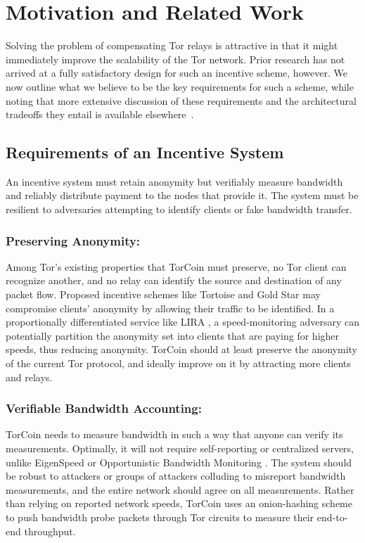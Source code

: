 \section{Motivation and Related Work} \label{motivation}

Solving the problem of
compensating Tor relays is attractive in that it might immediately improve the
scalability of the Tor network. Prior research has not arrived
at a fully satisfactory design for such an incentive scheme, however.
We now outline what we believe to be the key requirements for such a scheme,
while noting that more extensive discussion of these requirements
and the architectural tradeoffs they entail is available
elsewhere~\cite{jansen14onions}.

\subsection{Requirements of an Incentive System}
An incentive system must retain anonymity but verifiably measure
bandwidth and reliably distribute payment to the nodes that provide it. The
system must be resilient to adversaries attempting to identify clients or fake
bandwidth transfer.

\subsubsection{Preserving Anonymity:} 
Among Tor's existing properties that TorCoin must preserve,
no Tor client can recognize another, and no relay can
identify the source and destination of any packet flow. Proposed
incentive schemes like Tortoise\cite{acsac11-tortoise} and Gold Star\cite
{incentives-fc10} may compromise clients' anonymity by allowing their traffic
to be identified\cite{jansen2013lira}. In a proportionally differentiated
service \cite{blake1998architecture, dovrolis1999case} like LIRA
\cite{jansen2013lira},
a speed-monitoring adversary can potentially partition the
anonymity set into clients that are paying for higher speeds, thus reducing
anonymity. TorCoin should at least preserve the
anonymity of the current Tor protocol,
and ideally improve on it by attracting more clients and relays.

\subsubsection{Verifiable Bandwidth Accounting:} TorCoin needs to measure
bandwidth in such a way that anyone can verify its measurements. Optimally, it
will not require self-reporting or centralized servers, unlike EigenSpeed
\cite{snader2009eigenspeed} or Opportunistic Bandwidth Monitoring
\cite{snader2008tune}. The system should be robust to attackers or groups of
attackers colluding to misreport bandwidth measurements, and the entire network 
should agree on all measurements. Rather than relying on reported network
speeds, TorCoin uses an onion-hashing scheme to push bandwidth probe packets
through Tor circuits to measure their end-to-end throughput.


